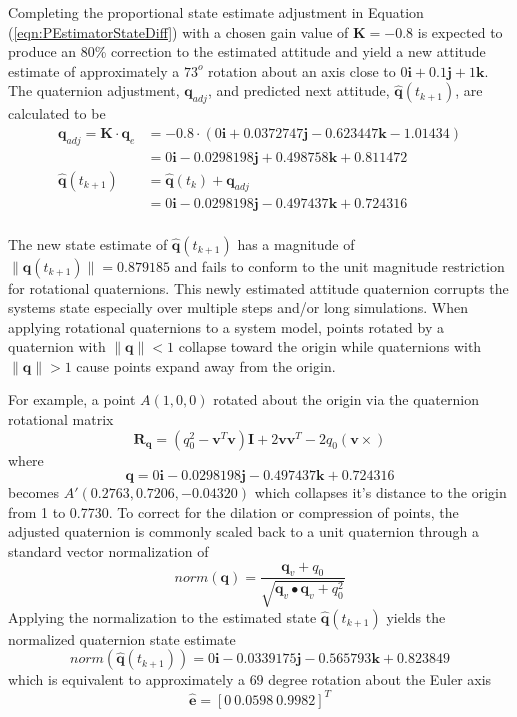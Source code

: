 \documentclass[]{aiaa-tc}%
\newcommand{\bs}[1]{\boldsymbol{#1}}
\begin{document}
Completing the proportional state estimate adjustment in Equation (\ref{eqn:PEstimatorStateDiff}) with a chosen gain value of $\bs{K} = -0.8$ is expected to produce an 80\% correction to the estimated attitude and yield a new attitude estimate of approximately a $73^o$ rotation about an axis close to $0 \bs{i} + 0.1 \bs{j} + 1\bs{k}$.  The quaternion adjustment, $\bs{q}_{adj}$, and predicted next attitude, $\bs{\hat{q}}(t_{k+1})$, are calculated to be
\begin{equation}
  \begin{aligned}
    \bs{q}_{adj} = \bs{K} \cdot \bs{q}_e &= -0.8 \cdot (0 \bs{i} + 0.0372747 \bs{j} -0.623447 \bs{k} -1.01434 ) \\
    &= 0 \bs{i} -0.0298198 \bs{j} +0.498758 \bs{k} +0.811472 \\
    \bs{\hat{q}}(t_{k+1}) &= \bs{\hat{q}}(t_{k}) + \bs{q}_{adj} \\
    &= 0 \bs{i} -0.0298198 \bs{j} -0.497437 \bs{k} + 0.724316 \\
  \end{aligned}
  \label{eqn:quat_add_adj}
\end{equation}

The new state estimate of $\bs{\hat{q}}(t_{k+1})$ has a magnitude of $ \| \bs{\hat{q}}(t_{k+1}) \| = 0.879185$ and fails to conform to the unit magnitude restriction for rotational quaternions.  This newly estimated attitude quaternion corrupts the systems state especially over multiple steps and/or long simulations.  When applying rotational quaternions to a system model, points rotated by a quaternion with $ \| \bs{q} \| < 1$ collapse toward the origin while quaternions with $ \| \bs{q} \| > 1$ cause points expand away from the origin.

For example, a point $A(1,0,0)$ rotated about the origin via the quaternion rotational matrix
\begin{equation}
  \bs{R_q} = (q_0^2 - \bs{v}^T \bs{v}) \bs{I} + 2 \bs{v} \bs{v}^T - 2 q_0 (\bs{v} \times)
\end{equation}
where
\begin{equation}
  \bs{q} = 0 \bs{i} -0.0298198 \bs{j} -0.497437 \bs{k} + 0.724316
\end{equation}
becomes $A'(0.2763, 0.7206, -0.04320)$ which collapses it's distance to the origin from 1 to 0.7730.  To correct for the dilation or compression of points, the adjusted quaternion is commonly scaled back to a unit quaternion through a standard vector normalization of
\begin{equation}
  norm(\bs{q}) = \frac{\bs{q}_v + q_0}{\sqrt{\bs{q}_v \bullet \bs{q}_v + q_0^2}}
  \label{eqn:NormalizeQuaternion}
\end{equation}
Applying the normalization to the estimated state $\bs{\hat{q}}(t_{k+1})$ yields the normalized quaternion state estimate
\begin{equation}
  norm(\bs{\hat{q}}(t_{k+1})) = 0 \bs{i} -0.0339175 \bs{j} -0.565793 \bs{k} +0.823849
\end{equation}
which is equivalent to approximately a $69$ degree rotation about the Euler axis
\begin{equation}
  \hat{\bs{e}} = [ 0 \ 0.0598 \ 0.9982 ]^T
\end{equation}
\end{document}
